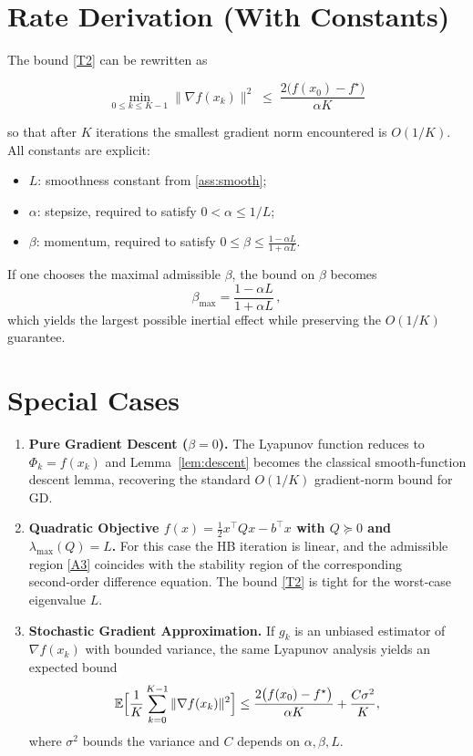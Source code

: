 \documentclass{article}
\begin{document}
\section*{Rate Derivation (With Constants)}
The bound \eqref{T2} can be rewritten as  

\[
\boxed{
\min_{0\le k\le K-1}\|\nabla f(x_k)\|^2
\;\le\;
\frac{2\bigl(f(x_0)-f^\star\bigr)}{\alpha K}
}
\tag{R1}
\]

so that after $K$ iterations the smallest gradient norm encountered is $O(1/K)$.  
All constants are explicit:
\begin{itemize}
\item $L$: smoothness constant from \ref{ass:smooth};
\item $\alpha$: stepsize, required to satisfy $0<\alpha\le1/L$;
\item $\beta$: momentum, required to satisfy $0\le\beta\le\frac{1-\alpha L}{1+\alpha L}$.
\end{itemize}
If one chooses the maximal admissible $\beta$, the bound on $\beta$ becomes
\[
\beta_{\max}= \frac{1-\alpha L}{1+\alpha L}\,,
\]
which yields the largest possible inertial effect while preserving the $O(1/K)$ guarantee.

\section*{Special Cases}
\begin{enumerate}[label=\alph*)]
\item \textbf{Pure Gradient Descent ($\beta=0$).}  
The Lyapunov function reduces to $\Phi_k=f(x_k)$ and Lemma~\ref{lem:descent} becomes the classical smooth‑function descent lemma, recovering the standard $O(1/K)$ gradient‑norm bound for GD.

\item \textbf{Quadratic Objective $f(x)=\frac12 x^\top Q x - b^\top x$ with $Q\succeq0$ and $\lambda_{\max}(Q)=L$.}  
For this case the HB iteration is linear, and the admissible region \eqref{A3} coincides with the stability region of the corresponding second‑order difference equation.  The bound \eqref{T2} is tight for the worst‑case eigenvalue $L$.

\item \textbf{Stochastic Gradient Approximation.}  
If $g_k$ is an unbiased estimator of $\nabla f(x_k)$ with bounded variance, the same Lyapunov analysis yields an expected bound 
\[
\mathbb{E}\Bigl[\frac{1}{K}\sum_{k=0}^{K-1}\| \nabla f(x_k)\|^2\Bigr]
\le
\frac{2\bigl(f(x_0)-f^\star\bigr)}{\alpha K}
+\frac{C\sigma^2}{K},
\]
where $\sigma^2$ bounds the variance and $C$ depends on $\alpha,\beta,L$.
\end{enumerate}
\end{document}
